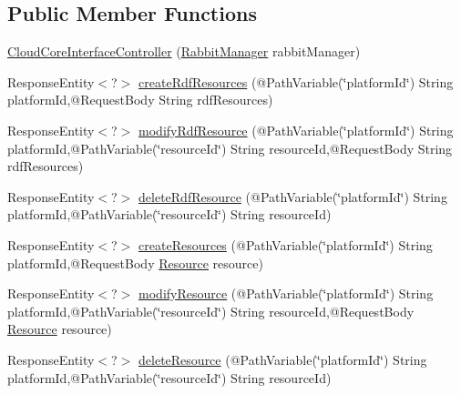 \subsection*{Public Member Functions}
\begin{DoxyCompactItemize}
\item 
\hyperlink{classeu_1_1h2020_1_1symbiote_1_1controllers_1_1CloudCoreInterfaceController_a19222abf4496aac62c037451b02c7f31}{Cloud\+Core\+Interface\+Controller} (\hyperlink{classeu_1_1h2020_1_1symbiote_1_1communication_1_1RabbitManager}{Rabbit\+Manager} rabbit\+Manager)
\item 
Response\+Entity$<$?$>$ \hyperlink{classeu_1_1h2020_1_1symbiote_1_1controllers_1_1CloudCoreInterfaceController_a86e93a8ba38be222f570d850ca2cfed0}{create\+Rdf\+Resources} (@Path\+Variable(\char`\"{}platform\+Id\char`\"{}) String platform\+Id,@Request\+Body String rdf\+Resources)
\item 
Response\+Entity$<$?$>$ \hyperlink{classeu_1_1h2020_1_1symbiote_1_1controllers_1_1CloudCoreInterfaceController_add9d780c27d48dfce1c84537b3e2963e}{modify\+Rdf\+Resource} (@Path\+Variable(\char`\"{}platform\+Id\char`\"{}) String platform\+Id,@Path\+Variable(\char`\"{}resource\+Id\char`\"{}) String resource\+Id,@Request\+Body String rdf\+Resources)
\item 
Response\+Entity$<$?$>$ \hyperlink{classeu_1_1h2020_1_1symbiote_1_1controllers_1_1CloudCoreInterfaceController_a1470a53850a203a85db8f0b93d18c362}{delete\+Rdf\+Resource} (@Path\+Variable(\char`\"{}platform\+Id\char`\"{}) String platform\+Id,@Path\+Variable(\char`\"{}resource\+Id\char`\"{}) String resource\+Id)
\item 
Response\+Entity$<$?$>$ \hyperlink{classeu_1_1h2020_1_1symbiote_1_1controllers_1_1CloudCoreInterfaceController_a9519d747900350a3e05f859a37c53780}{create\+Resources} (@Path\+Variable(\char`\"{}platform\+Id\char`\"{}) String platform\+Id,@Request\+Body \hyperlink{classeu_1_1h2020_1_1symbiote_1_1model_1_1Resource}{Resource} resource)
\item 
Response\+Entity$<$?$>$ \hyperlink{classeu_1_1h2020_1_1symbiote_1_1controllers_1_1CloudCoreInterfaceController_abb8609ab8c4a98d633a12d137e48ece8}{modify\+Resource} (@Path\+Variable(\char`\"{}platform\+Id\char`\"{}) String platform\+Id,@Path\+Variable(\char`\"{}resource\+Id\char`\"{}) String resource\+Id,@Request\+Body \hyperlink{classeu_1_1h2020_1_1symbiote_1_1model_1_1Resource}{Resource} resource)
\item 
Response\+Entity$<$?$>$ \hyperlink{classeu_1_1h2020_1_1symbiote_1_1controllers_1_1CloudCoreInterfaceController_a9697cf03798b509844d2dc675c50e463}{delete\+Resource} (@Path\+Variable(\char`\"{}platform\+Id\char`\"{}) String platform\+Id,@Path\+Variable(\char`\"{}resource\+Id\char`\"{}) String resource\+Id)
\end{DoxyCompactItemize}
